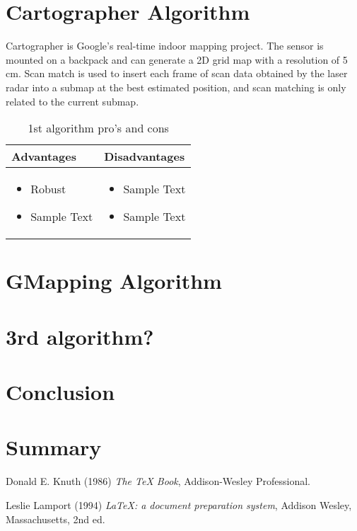 \documentclass[12pt, a4paper, onecolumn]{article}
\begin{document}
\section{Cartographer Algorithm}
Cartographer is Google's real-time indoor mapping project.
The sensor is mounted on a backpack and can generate a 2D
grid map with a resolution of 5 cm. Scan match is used to insert
each frame of scan data obtained by the laser radar into a
submap at the best estimated position, and scan matching is
only related to the current submap.
\begin{table}[h!]
\centering
\begin{tabular}{ |p{6cm}||p{6cm}|  }
 \hline
 Advantages&Disadvantages\\
 \hline
\begin{itemize}
  \item Robust
  \item Sample Text
  \end{itemize} 
  & 
  \begin{itemize}
  \item Sample Text
  \item Sample Text
  \end{itemize} \\

 \hline
\end{tabular}
\caption{1st algorithm pro's and cons }
\label{table:1}
\end{table}

\section{GMapping Algorithm}

\section{3rd algorithm?}

\section{Conclusion}

\section{Summary}
\newpage
\begin{thebibliography}{9}
Donald E. Knuth (1986) \emph{The \TeX{} Book}, Addison-Wesley Professional.

Leslie Lamport (1994) \emph{\LaTeX: a document preparation system}, Addison
Wesley, Massachusetts, 2nd ed.
\end{thebibliography}
\end{document}
